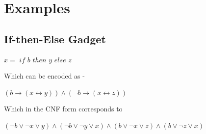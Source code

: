 \documentclass{article}
\theoremstyle{plain}
\begin{document}
\section{Examples}
\subsection{If-then-Else Gadget}
\begin{center}
$x = $ $if$ $b$ $then$ $y$ $else$ $z$
\end{center}
Which can be encoded as -
\begin{center}
$ (b \longrightarrow (x \longleftrightarrow y))  \wedge (\neg b \longrightarrow (x \longleftrightarrow z))$  
\end{center}
Which in the CNF form corresponds to
\begin{center}
$(\neg b \vee \neg x \vee y) \wedge (\neg b \vee \neg y \vee x) \wedge (b \vee \neg x \vee z) \wedge (b \vee \neg z \vee x)$
\end{center}
\nocite{*}


\end{document}
